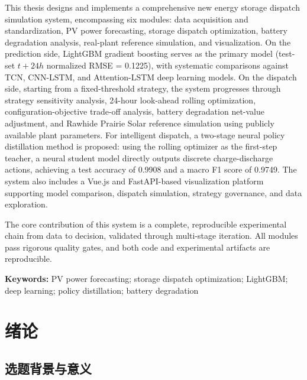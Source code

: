 \documentclass[12pt,a4paper]{ctexbook}
\begin{document}
This thesis designs and implements a comprehensive new energy storage dispatch simulation system, encompassing six modules: data acquisition and standardization, PV power forecasting, storage dispatch optimization, battery degradation analysis, real-plant reference simulation, and visualization. On the prediction side, LightGBM gradient boosting serves as the primary model (test-set $t+24h$ normalized RMSE = 0.1225), with systematic comparisons against TCN, CNN-LSTM, and Attention-LSTM deep learning models. On the dispatch side, starting from a fixed-threshold strategy, the system progresses through strategy sensitivity analysis, 24-hour look-ahead rolling optimization, configuration-objective trade-off analysis, battery degradation net-value adjustment, and Rawhide Prairie Solar reference simulation using publicly available plant parameters. For intelligent dispatch, a two-stage neural policy distillation method is proposed: using the rolling optimizer as the first-step teacher, a neural student model directly outputs discrete charge-discharge actions, achieving a test accuracy of 0.9908 and a macro F1 score of 0.9749. The system also includes a Vue.js and FastAPI-based visualization platform supporting model comparison, dispatch simulation, strategy governance, and data exploration.

The core contribution of this system is a complete, reproducible experimental chain from data to decision, validated through multi-stage iteration. All modules pass rigorous quality gates, and both code and experimental artifacts are reproducible.

\vspace{1cm}
\noindent\textbf{Keywords:} PV power forecasting; storage dispatch optimization; LightGBM; deep learning; policy distillation; battery degradation

\newpage

\tableofcontents
\newpage

\chapter{绪论}

\section{选题背景与意义}
\end{document}

